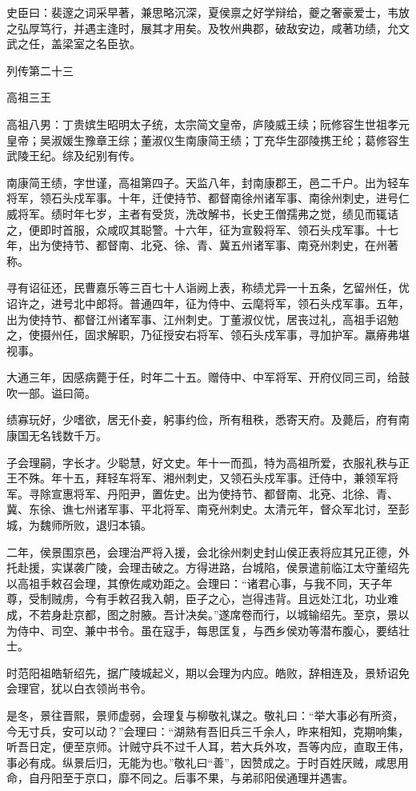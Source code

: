 \documentclass[12pt,UTF8]{ctexbook}
\begin{document}
史臣曰：裴邃之词采早著，兼思略沉深，夏侯禀之好学辩给，夔之奢豪爱士，韦放之弘厚笃行，并遇主逢时，展其才用矣。及牧州典郡，破敌安边，咸著功绩，允文武之任，盖梁室之名臣欤。





列传第二十三

高祖三王

高祖八男：丁贵嫔生昭明太子统，太宗简文皇帝，庐陵威王续；阮修容生世祖孝元皇帝；吴淑媛生豫章王综；董淑仪生南康简王绩；丁充华生邵陵携王纶；葛修容生武陵王纪。综及纪别有传。

南康简王绩，字世谨，高祖第四子。天监八年，封南康郡王，邑二千户。出为轻车将军，领石头戍军事。十年，迁使持节、都督南徐州诸军事、南徐州刺史，进号仁威将军。绩时年七岁，主者有受货，洗改解书，长史王僧孺弗之觉，绩见而辄诘之，便即时首服，众咸叹其聪警。十六年，征为宣毅将军、领石头戍军事。十七年，出为使持节、都督南、北兗、徐、青、冀五州诸军事、南兗州刺史，在州著称。

寻有诏征还，民曹嘉乐等三百七十人诣阙上表，称绩尤异一十五条，乞留州任，优诏许之，进号北中郎将。普通四年，征为侍中、云麾将军，领石头戍军事。五年，出为使持节、都督江州诸军事、江州刺史。丁董淑仪忧，居丧过礼，高祖手诏勉之，使摄州任，固求解职，乃征授安右将军、领石头戍军事，寻加护军。羸瘠弗堪视事。

大通三年，因感病薨于任，时年二十五。赠侍中、中军将军、开府仪同三司，给鼓吹一部。谥曰简。

绩寡玩好，少嗜欲，居无仆妾，躬事约俭，所有租秩，悉寄天府。及薨后，府有南康国无名钱数千万。

子会理嗣，字长才。少聪慧，好文史。年十一而孤，特为高祖所爱，衣服礼秩与正王不殊。年十五，拜轻车将军、湘州刺史，又领石头戍军事。迁侍中，兼领军将军。寻除宣惠将军、丹阳尹，置佐史。出为使持节、都督南、北兗、北徐、青、冀、东徐、谯七州诸军事、平北将军、南兗州刺史。太清元年，督众军北讨，至彭城，为魏师所败，退归本镇。

二年，侯景围京邑，会理治严将入援，会北徐州刺史封山侯正表将应其兄正德，外托赴援，实谋袭广陵，会理击破之。方得进路，台城陷，侯景遣前临江太守董绍先以高祖手敕召会理，其僚佐咸劝距之。会理曰：“诸君心事，与我不同，天子年尊，受制贼虏，今有手敕召我入朝，臣子之心，岂得违背。且远处江北，功业难成，不若身赴京都，图之肘腋。吾计决矣。”遂席卷而行，以城输绍先。至京，景以为侍中、司空、兼中书令。虽在寇手，每思匡复，与西乡侯劝等潜布腹心，要结壮士。

时范阳祖皓斩绍先，据广陵城起义，期以会理为内应。皓败，辞相连及，景矫诏免会理官，犹以白衣领尚书令。

是冬，景往晋熙，景师虚弱，会理复与柳敬礼谋之。敬礼曰：“举大事必有所资，今无寸兵，安可以动？”会理曰：“湖熟有吾旧兵三千余人，昨来相知，克期响集，听吾日定，便至京师。计贼守兵不过千人耳，若大兵外攻，吾等内应，直取王伟，事必有成。纵景后归，无能为也。”敬礼曰“善”，因赞成之。于时百姓厌贼，咸思用命，自丹阳至于京口，靡不同之。后事不果，与弟祁阳侯通理并遇害。
\end{document}
